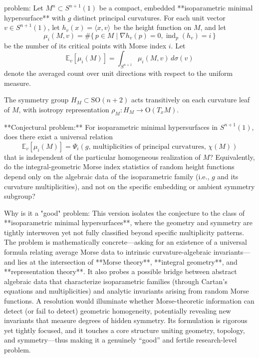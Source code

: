 problem:  
Let \(M^n \subset S^{n+1}(1)\) be a compact, embedded **isoparametric minimal hypersurface** with \(g\) distinct principal curvatures.  
For each unit vector \(v \in S^{n+1}(1)\), let \(h_v(x) = \langle x , v \rangle\)\ be the height function on \(M\), and let  
\[
\mu_i(M,v) = \#\{\,p \in M \mid \nabla h_v(p) = 0, \operatorname{ind}_p(h_v) = i\,\}
\]
be the number of its critical points with Morse index \(i\).  
Let  
\[
\mathbb{E}_v[\mu_i(M)] = \int_{S^{n+1}} \mu_i(M,v)\, d\sigma(v)
\]
denote the averaged count over unit directions with respect to the uniform measure.  

The symmetry group \(H_M \subset \mathrm{SO}(n+2)\) acts transitively on each curvature leaf of \(M\), with isotropy representation \(\rho_M: H_M \to \mathrm{O}(T_x M)\).  

**Conjectural problem:**  
For isoparametric minimal hypersurfaces in \(S^{n+1}(1)\), does there exist a universal relation
\[
\mathbb{E}_v[\mu_i(M)] = \Psi_i(g,\, \text{multiplicities of principal curvatures},\, \chi(M))
\]
that is independent of the particular homogeneous realization of \(M\)?  
Equivalently, do the integral-geometric Morse index statistics of random height functions depend only on the algebraic data of the isoparametric family (i.e., \(g\) and its curvature multiplicities), and not on the specific embedding or ambient symmetry subgroup?  

Why is it a "good" problem:  
This version isolates the conjecture to the class of **isoparametric minimal hypersurfaces**, where the geometry and symmetry are tightly interwoven yet not fully classified beyond specific multiplicity patterns. The problem is mathematically concrete—asking for an existence of a universal formula relating average Morse data to intrinsic curvature-algebraic invariants—and lies at the intersection of **Morse theory**, **integral geometry**, and **representation theory**.  
It also probes a possible bridge between abstract algebraic data that characterize isoparametric families (through Cartan’s equations and multiplicities) and analytic invariants arising from random Morse functions. A resolution would illuminate whether Morse-theoretic information can detect (or fail to detect) geometric homogeneity, potentially revealing new invariants that measure degrees of hidden symmetry.  
Its formulation is rigorous yet tightly focused, and it touches a core structure uniting geometry, topology, and symmetry—thus making it a genuinely “good” and fertile research-level problem.